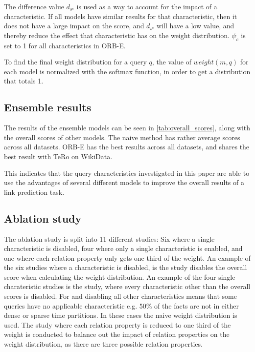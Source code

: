 The difference value $d_{s^c}$ is used as a way to account for the impact of a characteristic. If all models have similar results for that characteristic, then it does not have a large impact on the score, and $d_{s^c}$ will have a low value, and thereby reduce the effect that characteristic has on the weight distribution. $\psi_c$ is set to 1 for all characteristics in ORB-E.

To find the final weight distribution for a query $q$, the value of $\mathit{weight}(m, q)$ for each model is normalized with the softmax function, in order to get a distribution that totals 1. 

\subsection{Ensemble results}
The results of the ensemble models can be seen in \autoref{tab:overall_scores}, along with the overall scores of other models.
The naive method has rather average scores across all datasets.
ORB-E has the best results across all datasets, and shares the best result with TeRo on WikiData.



This indicates that the query characteristics investigated in this paper are able to use the advantages of several different models to improve the overall results of a link prediction task.

\subsection{Ablation study}
The ablation study is split into 11 different studies: Six where a single characteristic is disabled, four where only a single characteristic is enabled, and one where each relation property only gets one third of the weight.
An example of the six studies where a characteristic is disabled, is the  study disables the overall score when calculating the weight distribution. 
An example of the four single charateristic studies is the  study, where every characteristic other than the overall scores is disabled. 
For  and  disabling all other characteristics means that some queries have no applicable characteristic e.g. 50\% of the facts are not in either dense or sparse time partitions. In these cases the naive weight distribution is used.
The study where each relation property is reduced to one third of the weight is conducted to balance out the impact of relation properties on the weight distribution, as there are three possible relation properties.


